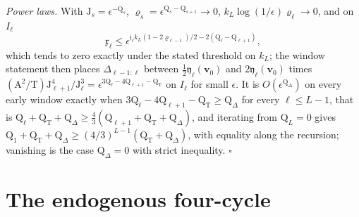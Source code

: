 \emph{Power laws.} With \(\mathrm J_s=\epsilon^{-\mathrm Q_s}\),
\(\varrho_s=\epsilon^{\mathrm Q_s-\mathrm Q_{s+1}}\to0\),
\(k_L\log(1/\epsilon)\varrho_\ell\to0\), and on \(I_\ell\)
\[
\mathfrak x_\ell\le\epsilon^{\mathfrak j_\ell k_L(1-2\varrho_{\ell-1})/2-2(\mathrm Q_\ell-\mathrm Q_{\ell+1})},
\]
which tends to zero exactly under the stated threshold on \(k_L\); the
window statement then places \(\Delta_{\ell-1:\ell}\) between
\(\tfrac12\mathfrak y_\ell(\mathbf v_0)\) and \(2\mathfrak y_\ell(\mathbf v_0)\)
times \((\mathrm A^2/\mathrm T)\mathrm J_{\ell+1}^4/\mathrm J_\ell^3
=\epsilon^{3\mathrm Q_\ell-4\mathrm Q_{\ell+1}-\mathrm Q_{\mathrm T}}\) on
\(I_\ell\) for small \(\epsilon\). It is \(O(\epsilon^{\mathrm Q_\Delta})\)
on every early window exactly when
\(3\mathrm Q_\ell-4\mathrm Q_{\ell+1}-\mathrm Q_{\mathrm T}\ge\mathrm Q_\Delta\)
for every \(\ell\le L-1\), that is
\(\mathrm Q_\ell+\mathrm Q_{\mathrm T}+\mathrm Q_\Delta\ge\tfrac43(\mathrm Q_{\ell+1}+\mathrm Q_{\mathrm T}+\mathrm Q_\Delta)\),
and iterating from \(\mathrm Q_L=0\) gives
\(\mathrm Q_1+\mathrm Q_{\mathrm T}+\mathrm Q_\Delta\ge(4/3)^{L-1}(\mathrm Q_{\mathrm T}+\mathrm Q_\Delta)\),
with equality along the recursion; vanishing is the case
\(\mathrm Q_\Delta=0\) with strict inequality. \(\square\)

\section{The endogenous four-cycle}
\label{sec:rg-formation-cycle-proof}


